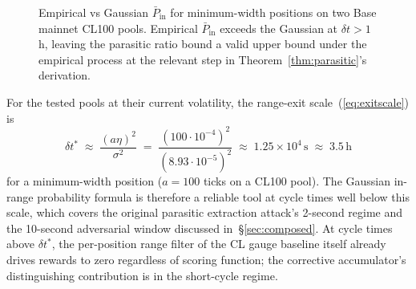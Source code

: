 \documentclass[11pt,a4paper]{article}
\theoremstyle{definition}
\theoremstyle{plain}
\theoremstyle{remark}
\begin{document}
\begin{figure}[H]
\centering
{}
\caption{Empirical vs Gaussian $\bar P_{\text{in}}$ for minimum-width positions on two Base mainnet CL100 pools. Empirical $\bar P_{\text{in}}$ exceeds the Gaussian at $\delta t > 1$\,h, leaving the parasitic ratio bound a valid upper bound under the empirical process at the relevant step in Theorem~\ref{thm:parasitic}'s derivation.}
\label{fig:pinvalidation}
\end{figure}

For the tested pools at their current volatility, the range-exit scale~(\ref{eq:exitscale}) is
\[
\delta t^* \;\approx\; \frac{(a\eta)^2}{\sigma^2} \;=\; \frac{(100 \cdot 10^{-4})^2}{(8.93 \cdot 10^{-5})^2} \;\approx\; 1.25 \times 10^4\,\text{s} \;\approx\; 3.5\,\text{h}
\]
for a minimum-width position ($a = 100$ ticks on a CL100 pool). The Gaussian in-range probability formula is therefore a reliable tool at cycle times well below this scale, which covers the original parasitic extraction attack's 2-second regime and the 10-second adversarial window discussed in~\S\ref{sec:composed}. At cycle times above $\delta t^*$, the per-position range filter of the CL gauge baseline itself already drives rewards to zero regardless of scoring function; the corrective accumulator's distinguishing contribution is in the short-cycle regime.
\end{document}

